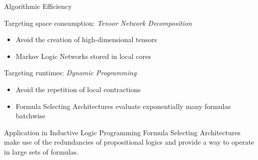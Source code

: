 \documentclass{beamer}
\begin{document}
\begin{frame}{Algorithmic Efficiency}


Targeting space consumption: \emph{Tensor Network Decomposition}
\begin{itemize}
	\item Avoid the creation of high-dimensional tensors
	\item {Markov Logic Networks stored in local cores}
\end{itemize}

Targeting runtimes: \emph{Dynamic Programming}
\begin{itemize}
	\item Avoid the repetition of local contractions
	\item {Formula Selecting Architectures evaluate exponentially many formulas batchwise}
\end{itemize}

\begin{block}{Application in Inductive Logic Programming}
	Formula Selecting Architectures make use of the redundancies of propositional logics and provide a way to operate in large sets of formulas.
\end{block}

\end{frame}
\end{document}
